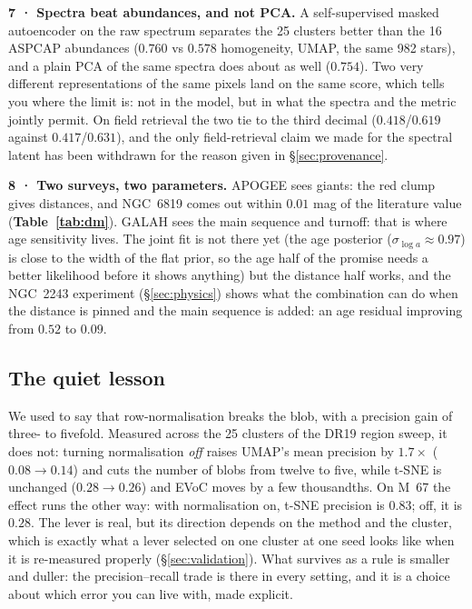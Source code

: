 \textbf{7 · Spectra beat abundances, and not PCA.} A self-supervised masked
autoencoder on the raw spectrum separates the 25 clusters better than the 16
ASPCAP abundances ($0.760$ vs $0.578$ homogeneity, UMAP, the same 982 stars),
and a plain PCA of the same spectra does about as well ($0.754$). Two very
different representations of the same pixels land on the same score, which
tells you where the limit is: not in the model, but in what the spectra and the
metric jointly permit. On field retrieval the two tie to the third decimal
($0.418$/$0.619$ against $0.417$/$0.631$), and the only field-retrieval claim
we made for the spectral latent has been withdrawn for the reason given in
\S\ref{sec:provenance}.

\textbf{8 · Two surveys, two parameters.} APOGEE sees giants: the red clump
gives distances, and NGC~6819 comes out within $0.01$ mag of the literature
value (\textbf{Table~\ref{tab:dm}}). GALAH sees the main sequence and turnoff:
that is where age sensitivity lives. The joint fit is not there yet (the age
posterior ($\sigma_{\log a} \approx 0.97$) is close to the width of the flat
prior, so the age half of the promise needs a better likelihood before it shows
anything) but the distance half works, and the NGC~2243 experiment
(\S\ref{sec:physics}) shows what the combination can do when the distance is
pinned and the main sequence is added: an age residual improving from $0.52$ to
$0.09$.

\subsection{The quiet lesson}

We used to say that row-normalisation breaks the blob, with a precision gain
of three- to fivefold. Measured across the 25 clusters of the DR19 region sweep,
it does not: turning normalisation \emph{off} raises UMAP's mean precision by
$1.7\times$ ($0.08 \rightarrow 0.14$) and cuts the number of blobs from twelve to
five, while t-SNE is unchanged ($0.28 \rightarrow 0.26$) and EVoC moves by a
few thousandths. On M~67 the effect runs the other way: with normalisation on,
t-SNE precision is $0.83$; off, it is $0.28$. The lever is real, but its
direction depends on the method and the cluster, which is exactly what a
lever selected on one cluster at one seed looks like when it is re-measured
properly (\S\ref{sec:validation}). What survives as a rule is smaller and
duller: the precision--recall trade is there in every setting, and it is a
choice about which error you can live with, made explicit.

